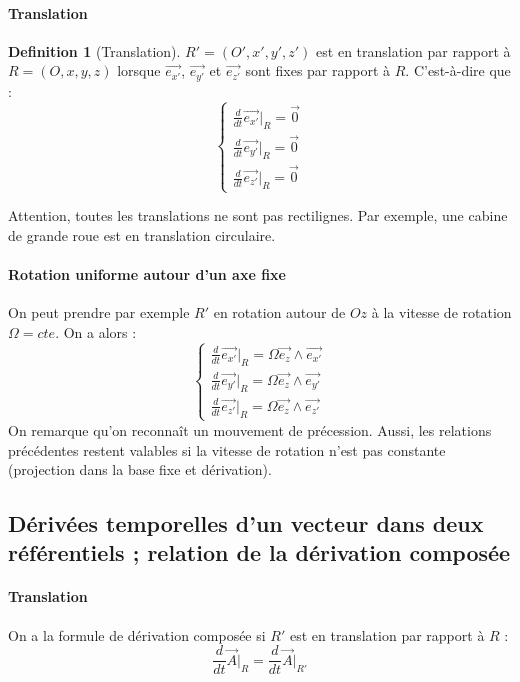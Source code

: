\documentclass[french]{book}
\theoremstyle{plain}
\theoremstyle{definition}
\newtheorem{dfn}{Definition}
\theoremstyle{remark}
\begin{document}
\paragraph{Translation}
\begin{dfn}[Translation]
	$R'=(O',x',y',z')$ est en translation par rapport à $R=(O,x,y,z)$ lorsque $\overrightarrow{e_{x'}}$, $\overrightarrow{e_{y'}}$ et $\overrightarrow{e_{z'}}$ sont fixes par rapport à $R$. C'est-à-dire que : $$\begin{cases}
		\displaystyle \frac{d}{dt}\overrightarrow{e_{x'}}\bigg\rvert_R=\overrightarrow{0} \\[4mm]
		\displaystyle \frac{d}{dt}\overrightarrow{e_{y'}}\bigg\rvert_R=\overrightarrow{0} \\[4mm]
		\displaystyle \frac{d}{dt}\overrightarrow{e_{z'}}\bigg\rvert_R=\overrightarrow{0}
	\end{cases}$$
\end{dfn}
Attention, toutes les translations ne sont pas rectilignes. Par exemple, une cabine de grande roue est en translation circulaire.
\paragraph{Rotation uniforme autour d'un axe fixe} On peut prendre par exemple $R'$ en rotation autour de $Oz$ à la vitesse de rotation $\Omega=cte$. On a alors : $$\begin{cases}
	\displaystyle \frac{d}{dt}\overrightarrow{e_{x'}}\bigg\rvert_R=\Omega \overrightarrow{e_z}\wedge\overrightarrow{e_{x'}} \\[4mm]
	\displaystyle \frac{d}{dt}\overrightarrow{e_{y'}}\bigg\rvert_R=\Omega \overrightarrow{e_z}\wedge\overrightarrow{e_{y'}} \\[4mm]
	\displaystyle \frac{d}{dt}\overrightarrow{e_{z'}}\bigg\rvert_R=\Omega \overrightarrow{e_z}\wedge\overrightarrow{e_{z'}}
\end{cases}$$
On remarque qu'on reconnaît un mouvement de précession. Aussi, les relations précédentes restent valables si la vitesse de rotation n'est pas constante (projection dans la base fixe et dérivation).
\subsection{Dérivées temporelles d'un vecteur dans deux référentiels ; relation de la dérivation composée}
\paragraph{Translation} On a la formule de dérivation composée si $R'$ est en translation par rapport à $R$ : $$\frac{d}{dt}\overrightarrow{A}\bigg\rvert_R=\frac{d}{dt}\overrightarrow{A}\bigg\rvert_{R'}$$
\end{document}
